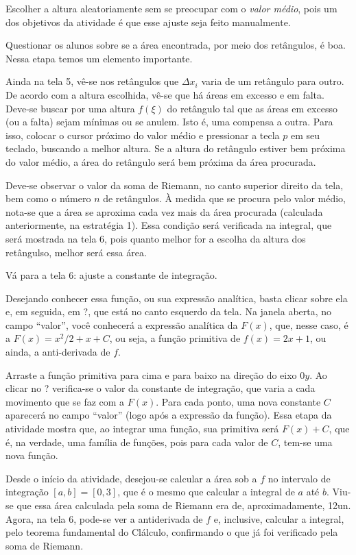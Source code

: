\documentclass[a4paper,12pt]{scrartcl}
\begin{document}
    Escolher a altura aleatoriamente sem se preocupar com o \emph{valor médio}, pois um dos objetivos da atividade é que esse ajuste seja feito manualmente.
    
    Questionar os alunos sobre se a área encontrada, por meio dos retângulos, é boa. Nessa etapa temos um elemento importante.

    Ainda na tela 5, vê-se nos retângulos que $\Delta x_i$ varia de um retângulo para outro. De acordo com a altura escolhida, vê-se que há áreas em excesso e em falta. Deve-se buscar por uma altura $f(\xi)$ do retângulo tal que as áreas em excesso (ou a falta) sejam mínimas ou se anulem. Isto é, uma compensa a outra. Para isso, colocar o cursor próximo do valor médio e pressionar a tecla $p$ em seu teclado, buscando a melhor altura. Se a altura do retângulo estiver bem próxima do valor médio, a área do retângulo será bem próxima da área procurada.
    
    Deve-se observar o valor da soma de Riemann, no canto superior direito da tela, bem como o número $n$ de retângulos. À medida que se procura pelo valor médio, nota-se que a área se aproxima cada vez mais da área procurada (calculada anteriormente, na estratégia 1). Essa condição será verificada na integral, que será mostrada na tela 6, pois quanto melhor for a escolha da altura dos retângulso, melhor será essa área.
    
    Vá para a tela 6: ajuste a constante de integração.
    
    Desejando conhecer essa função, ou sua expressão analítica, basta clicar sobre ela e, em seguida, em ?, que está no canto esquerdo da tela. Na janela aberta, no campo ``valor'', você conhecerá a expressão analítica da $F(x)$, que, nesse caso, é a $F(x) = x^2/2 + x + C$, ou seja, a função primitiva de $f(x) = 2x + 1$, ou ainda, a anti-derivada de $f$.
    
    Arraste a função primitiva para cima e para baixo na direção do eixo $0y$. Ao clicar no ? verifica-se o valor da constante de integração, que varia a cada movimento que se faz com a $F(x)$. Para cada ponto, uma nova constante $C$ aparecerá no campo ``valor'' (logo após a expressão da função). Essa etapa da atividade mostra que, ao integrar uma função, sua primitiva será $F(x) + C$, que é, na verdade, uma família de funções, pois para cada valor de $C$, tem-se uma nova função.
    
    Desde o início da atividade, desejou-se calcular a área sob a $f$ no intervalo de integração $[a,b] = [0,3]$, que é o mesmo que calcular a integral de $a$ até $b$. Viu-se que essa área calculada pela soma de Riemann era de, aproximadamente, \unit{12}{\squaren un}. Agora, na tela 6, pode-se ver a antiderivada de $f$ e, inclusive, calcular a integral, pelo teorema fundamental do Clálculo, confirmando o que já foi verificado pela soma de Riemann.
    
\end{document}
